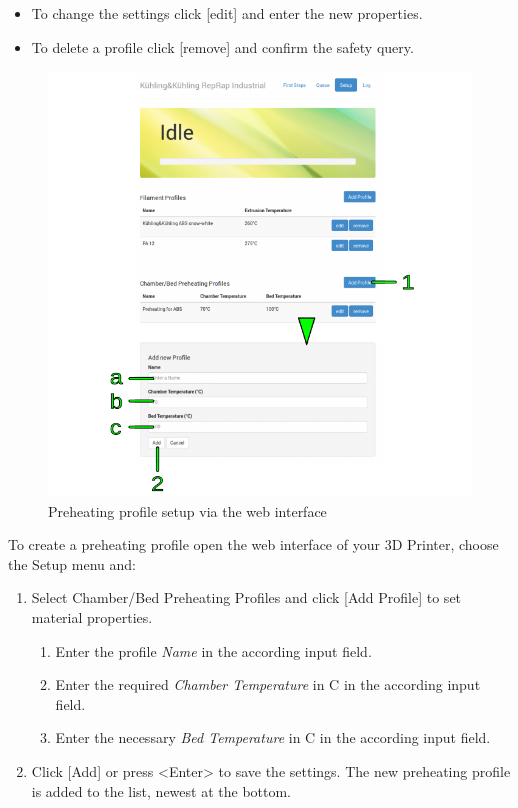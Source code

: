 \begin{itemize}
  \item To change the settings click [edit] and enter the new properties.
  \item To delete a profile click [remove] and confirm the safety query.
\end{itemize}

\begin{figure}[H]
  \centering
  \includegraphics[width=.7\linewidth]{./img/wif_setup_addpreheatingprofile.png}
  \caption{Preheating profile setup via the web interface}
\end{figure}

To create a preheating profile open the web interface of your 3D Printer, choose the Setup menu and: 

\begin{enumerate}
  \item Select Chamber/Bed Preheating Profiles and click [Add Profile] to set 
        material properties.
    \begin{enumerate}
      \item Enter the profile \emph{Name} in the according input field.
      \item Enter the required \emph{Chamber Temperature} in \degree C in the
            according input field.
      \item Enter the necessary \emph{Bed Temperature} in \degree C in the according 
            input field.
    \end{enumerate}
  \item Click [Add] or press <Enter> to save the settings. The new preheating 
        profile is added to the list, newest at the bottom.
\end{enumerate}

